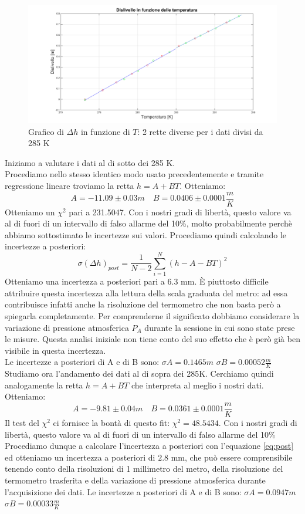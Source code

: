 \begin{figure}[H]
\centering
\includegraphics[width=\textwidth]{img/2}
\caption{Grafico di $\Delta h$ in funzione di $T$: 2 rette diverse per i dati divisi da 285 K}
\end{figure}

Iniziamo a valutare i dati al di sotto dei 285 K.\\
Procediamo nello stesso identico modo usato precedentemente e tramite regressione lineare troviamo la retta $h = A+BT$.
Otteniamo:
\[A = -11.09 \pm 0.03 m \quad  B = 0.0406\pm 0.0001 \frac{m}{K}\]
Otteniamo un $\chi^2$ pari a 231.5047. 
Con i nostri gradi di libertà, questo valore va al di fuori di un intervallo di falso allarme del 10\%, molto probabilmente perchè abbiamo sottostimato le incertezze sui valori.
Procediamo quindi calcolando le incertezze a posteriori:
\begin{equation}
\label{eq:post}
\sigma(\Delta h)_{post} = \frac{1}{N-2}\sum_{i=1}^N(h-A-BT)^2
\end{equation}
Otteniamo una incertezza a posteriori pari a $6.3$ mm. 
È piuttosto difficile attribuire questa incertezza alla lettura della scala graduata del metro: ad essa contribuisce infatti anche la risoluzione del termometro che non basta però a spiegarla completamente. 
Per comprenderne il significato dobbiamo considerare la variazione di pressione atmosferica $P_A$ durante la sessione in cui sono state prese le misure. 
Questa analisi iniziale non tiene conto del suo effetto che è però già ben visibile in questa incertezza.\\
Le incertezze a posteriori di A e di B sono: $\sigma A = 0.1465m$ $\sigma B = 0.00052\frac{m}{K}$
\newline
Studiamo ora l'andamento dei dati al di sopra dei 285K. 
Cerchiamo quindi analogamente la retta $h = A+BT$ che interpreta al meglio i nostri dati. 
Otteniamo:
\[A = -9.81 \pm 0.04 m \quad  B = 0.0361 \pm 0.0001 \frac{m}{K}\]
Il test del $\chi^2$ ci fornisce la bontà di questo fit: $\chi^2 = 48.5434$. 
Con i nostri gradi di libertà, questo valore va al di fuori di un intervallo di falso allarme del 10\% 
Procediamo dunque a calcolare l'incertezza a posteriori con l'equazione \eqref{eq:post} ed otteniamo un incertezza a posteriori di $2.8$ mm, che può essere comprensibile tenendo conto della risoluzioni di 1 millimetro del metro, della risoluzione del termometro trasferita e della variazione di pressione atmosferica durante l'acquisizione dei dati.
Le incertezze a posteriori di A e di B sono: $\sigma A = 0.0947m$ $\sigma B = 0.00033\frac{m}{K}$


